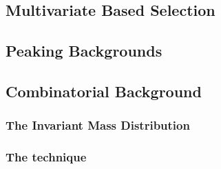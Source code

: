 

\subsection{Multivariate Based Selection}

\subsection{Peaking Backgrounds}

\subsection{Combinatorial Background}

\subsubsection{The \BJpsiKpi Invariant Mass Distribution}
\label{The_Invariant_Mass_Distribution}

\subsubsection{The \sPlot technique}

